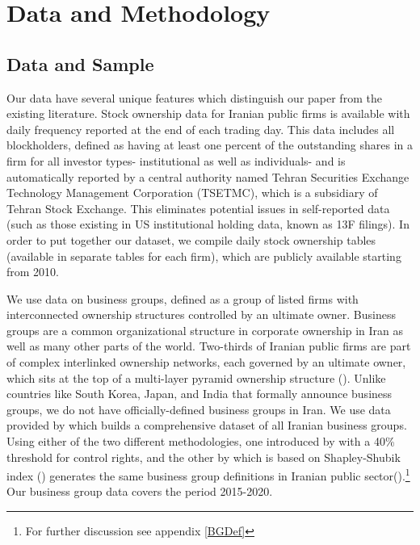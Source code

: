 
\section{{Data and Methodology}}



\subsection{{Data and Sample}}



Our data have several unique features which distinguish our paper from the existing literature. Stock ownership data for Iranian public firms is available with daily frequency reported at the end of each trading day. This data includes all blockholders, defined as having at least one percent of the outstanding shares in a firm for all investor types- institutional as well as individuals- and is automatically reported by a central authority named Tehran Securities Exchange Technology Management Corporation (TSETMC), which is a subsidiary of Tehran Stock Exchange. This eliminates potential issues in self-reported data (such as those existing in US institutional holding data, known as 13F filings). In order to put together our dataset, we compile daily stock ownership tables (available in separate tables for each firm), which are publicly available starting from 2010.

We use data on business groups, defined as a group of listed firms with interconnected ownership structures controlled by an ultimate owner. Business groups are a common organizational structure in corporate ownership in Iran as well as many other parts of the world. Two-thirds of Iranian public firms are part of complex interlinked ownership networks, each governed by an ultimate owner, which sits at the top of a multi-layer pyramid ownership structure ({\cite{Aliabadi2022}}). Unlike countries like South Korea, Japan, and India that formally announce business groups, we do not have officially-defined business groups in Iran. We use data provided by {\cite{Aliabadi2022}} which builds a comprehensive dataset of all Iranian business groups. Using either of the two different methodologies, one introduced by \cite{almeida2011structure} with a 40\% threshold for control rights, and the other by \cite{aminadav2011rebuilding} which is based on Shapley-Shubik index (\cite{shapley1954method}) generates the same business group definitions in Iranian public sector({\cite{Aliabadi2022}}).\footnote{For further discussion see appendix \ref{BGDef}} Our business group data covers the period 2015-2020.  




